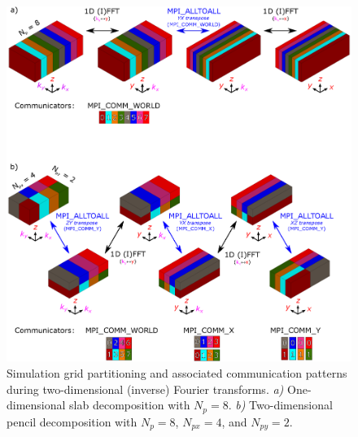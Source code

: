 \begin{figure}
	\includegraphics[width=\textwidth]{figures/meth_slab_pencil.eps}
	\caption{Simulation grid partitioning and associated communication patterns during two-dimensional (inverse) Fourier transforms. \emph{a)} One-dimensional slab decomposition with $N_p = 8$. \emph{b)} Two-dimensional pencil decomposition with $N_p = 8$, $N_{px} = 4$, and $N_{py} = 2$. \label{fig:grid_partitioning}}
\end{figure}

